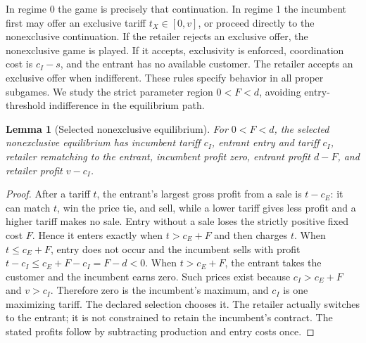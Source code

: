 \documentclass[11pt]{article}
\newtheorem{lemma}[theorem]{Lemma}
\theoremstyle{remark}
\begin{document}
In regime 0 the game is precisely that continuation. In regime 1 the
incumbent first may offer an exclusive tariff $t_X\in[0,v]$, or proceed
directly to the nonexclusive continuation. If the retailer rejects an
exclusive offer, the nonexclusive game is played. If it accepts,
exclusivity is enforced, coordination cost is $c_I-s$, and the entrant
has no available customer. The retailer accepts an exclusive offer
when indifferent. These rules specify behavior in all proper subgames.
We study the strict parameter region $0<F<d$, avoiding entry-threshold
indifference in the equilibrium path.

\begin{lemma}[Selected nonexclusive equilibrium]\label{nonexclusive}
For $0<F<d$, the selected nonexclusive equilibrium has incumbent tariff
$c_I$, entrant entry and tariff $c_I$, retailer rematching to the
entrant, incumbent profit zero, entrant profit $d-F$, and retailer
profit $v-c_I$.
\end{lemma}
\begin{proof}
After a tariff $t$, the entrant's largest gross profit from a sale is
$t-c_E$: it can match $t$, win the price tie, and sell, while a lower
tariff gives less profit and a higher tariff makes no sale. Entry
without a sale loses the strictly positive fixed cost $F$. Hence it
enters exactly when $t>c_E+F$ and then charges $t$.
When $t\leq c_E+F$, entry does not occur and the incumbent sells with
profit $t-c_I\leq c_E+F-c_I=F-d<0$. When $t>c_E+F$, the entrant takes
the customer and the incumbent earns zero. Such prices exist because
$c_I>c_E+F$ and $v>c_I$. Therefore zero is the incumbent's maximum,
and $c_I$ is one maximizing tariff. The declared selection chooses it.
The retailer actually switches to the entrant; it is not constrained
to retain the incumbent's contract. The stated profits follow by
subtracting production and entry costs once.
\end{proof}
\end{document}
